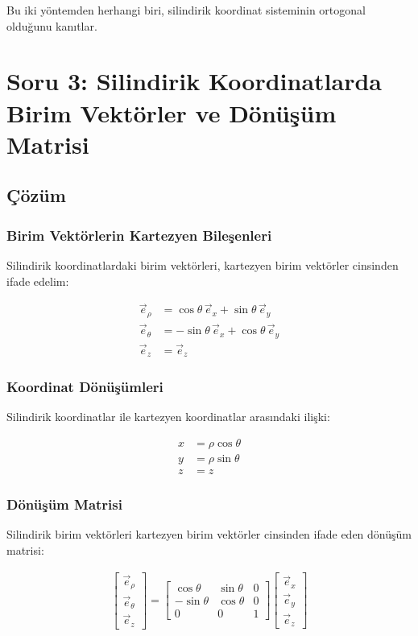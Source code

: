 \documentclass{fenbil}
\begin{document}
Bu iki yöntemden herhangi biri, silindirik koordinat sisteminin ortogonal olduğunu kanıtlar.

\section{Soru 3: Silindirik Koordinatlarda Birim Vektörler ve Dönüşüm Matrisi}

\subsection{Çözüm}

\subsubsection{Birim Vektörlerin Kartezyen Bileşenleri}

Silindirik koordinatlardaki birim vektörleri, kartezyen birim vektörler cinsinden ifade edelim:

\begin{align}
\vec{e}_\rho &= \cos\theta\, \vec{e}_x + \sin\theta\, \vec{e}_y \\
\vec{e}_\theta &= -\sin\theta\, \vec{e}_x + \cos\theta\, \vec{e}_y \\
\vec{e}_z &= \vec{e}_z
\end{align}

\subsubsection{Koordinat Dönüşümleri}

Silindirik koordinatlar ile kartezyen koordinatlar arasındaki ilişki:

\begin{align}
x &= \rho \cos\theta \\
y &= \rho \sin\theta \\
z &= z
\end{align}

\subsubsection{Dönüşüm Matrisi}

Silindirik birim vektörleri kartezyen birim vektörler cinsinden ifade eden dönüşüm matrisi:

\begin{align}
\begin{bmatrix} \vec{e}_\rho \\ \vec{e}_\theta \\ \vec{e}_z \end{bmatrix} = 
\begin{bmatrix} 
\cos\theta & \sin\theta & 0 \\
-\sin\theta & \cos\theta & 0 \\
0 & 0 & 1
\end{bmatrix}
\begin{bmatrix} \vec{e}_x \\ \vec{e}_y \\ \vec{e}_z \end{bmatrix}
\end{align}
\end{document}
